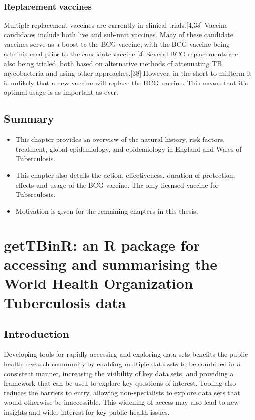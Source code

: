 \documentclass[11pt,twoside]{bristolthesis}
\begin{document}
  \hypertarget{replacement-vaccines}{%
  \subsection{Replacement vaccines}\label{replacement-vaccines}}
  
  Multiple replacement vaccines are currently in clinical trials.{[}4,38{]} Vaccine candidates include both live and sub-unit vaccines. Many of these candidate vaccines serve as a boost to the BCG vaccine, with the BCG vaccine being administered prior to the candidate vaccine.{[}4{]} Several BCG replacements are also being trialed, both based on alternative methods of attenuating TB mycobacteria and using other approaches.{[}38{]} However, in the short-to-midterm it is unlikely that a new vaccine will replace the BCG vaccine. This means that it's optimal usage is as important as ever.
  
  \hypertarget{summary-1}{%
  \section{Summary}\label{summary-1}}
  \begin{itemize}
  \item
    This chapter provides an overview of the natural history, risk factors, treatment, global epidemiology, and epidemiology in England and Wales of Tuberculosis.
  \item
    This chapter also details the action, effectiveness, duration of protection, effects and usage of the BCG vaccine. The only licensed vaccine for Tuberculosis.
  \item
    Motivation is given for the remaining chapters in this thesis.
  \end{itemize}
  \hypertarget{getTBinR}{%
  \chapter{getTBinR: an R package for accessing and summarising the World Health Organization Tuberculosis data}\label{getTBinR}}
  
  \hypertarget{introduction-1}{%
  \section{Introduction}\label{introduction-1}}
  
  Developing tools for rapidly accessing and exploring data sets benefits the public health research community by enabling multiple data sets to be combined in a consistent manner, increasing the visibility of key data sets, and providing a framework that can be used to explore key questions of interest. Tooling also reduces the barriers to entry, allowing non-specialists to explore data sets that would otherwise be inaccessible. This widening of access may also lead to new insights and wider interest for key public health issues.
  
\end{document}
